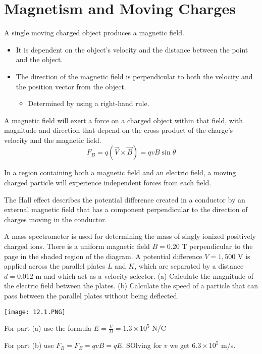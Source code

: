 \documentclass[../em.tex]{subfiles}
\begin{document}
\section{Magnetism and Moving Charges}
A single moving charged object produces a magnetic field.
\begin{itemize}
    \item It is dependent on the object's velocity and the distance between the point and the object.
    \item The direction of the magnetic field is perpendicular to both the velocity and the position vector from the object. 
    \begin{itemize}
        \item Determined by using a right-hand rule.
    \end{itemize}
\end{itemize}

A magnetic field will exert a force on a charged object within that field, with magnitude and direction that depend on the cross-product of the charge's velocity and the magnetic field.
\[ F_B = q(\vec{V}\times \vec{B})=qvB\sin\theta \]

In a region containing both a magnetic field and an electric field, a moving charged particle will experience independent forces from each field.

The Hall effect describes the potential difference created in a conductor by an external magnetic field that has a component perpendicular to the direction of charges moving in the conductor.

\begin{example}
    A mass spectrometer is used for determining the mass of singly ionized positively charged ions. There is a uniform magnetic field $B=0.20$ T perpendicular to the page in the shaded region of the diagram. 
    A potential difference $V=1,500$ V is applied across the parallel plates $L$ and $K$, which are separated by a distance $d=0.012$ m and which act as a velocity selector. 
    (a) Calculate the magnitude of the electric field between the plates. (b) Calculate the speed of a particle that can pass between the parallel plates without being deflected.

    \begin{center}
        \texttt{[image: 12.1.PNG]}
    \end{center}

    For part (a) use the formula $E=\frac{V}{D}=1.3\times 10^5$ N/C 

    For part (b) use $F_B=F_E = qvB=qE$. SOlving for $v$ we get $6.3\times 10^5$ m/s.
\end{example}
\end{document}
